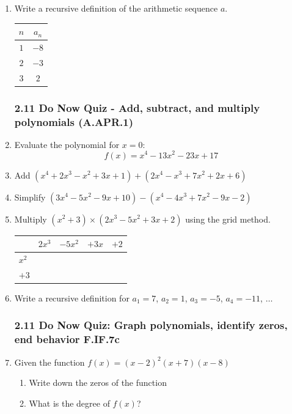 \documentclass[12pt, twoside]{article}
\begin{document}
\begin{enumerate}[itemsep=1.5cm]
\item Write a recursive definition of the arithmetic sequence $a$. \\[0.5cm]
    \begin{tabular}{|c|c|}
    \hline
    $n$ & $a_n$ \\
    \hline
    $1$ & $-8$ \\
    $2$ & $-3$ \\
    $3$ & $2$ \\
    \hline
    \end{tabular}

\newpage
\subsubsection*{2.11 Do Now Quiz - Add, subtract, and multiply polynomials (A.APR.1)}
\vspace{-1.5cm}
\setcounter{enumi}{0}
\item Evaluate the polynomial for $x=0$:
\[f(x) = x^4-13x^2 - 23x + 17\]

\item Add $(x^4+2x^3-x^2 + 3x + 1)+(2x^4-x^3+7x^2 + 2x + 6)$

\item Simplify $(3x^4-5x^2 -9x + 10)-(x^4-4x^3+7x^2 -9x - 2)$

\item Multiply $(x^2+3) \times (2x^3-5x^2+3x+2)$ using the grid method.\\[0.5cm]
    \renewcommand{\arraystretch}{2}
    \begin{tabular}{|p{0.5cm}|p{2cm}|p{2cm}|p{2cm}|p{2cm}|}
        \hline
        & $2x^3$ & $-5x^2$ & $+3x$ & $+2$ \\
        \hline
        $x^2$ & & & & \\
        \hline
        $+3$ & & & & \\
        \hline
    \end{tabular}

\item Write a recursive definition for $a_1 = 7$, $a_2 = 1$, $a_3 = -5$, $a_4 = -11$, $\ldots$

\newpage
\subsubsection*{2.11 Do Now Quiz: Graph polynomials, identify zeros, end behavior F.IF.7c}
\vspace{-1.5cm}
\setcounter{enumi}{0}
\item Given the function $f(x)=(x-2)^2 (x+7)(x-8)$
    \begin{enumerate}
        \item Write down the zeros of the function \\[0.25cm]
        \item What is the degree of $f(x)$?
    \end{enumerate} \vspace{1cm}


\end{enumerate}
\end{document}
